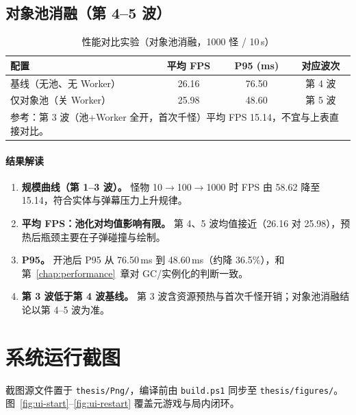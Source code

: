 \subsection{对象池消融（第 4--5 波）}

\begin{table}[htbp]
  \centering
  \caption{性能对比实验（对象池消融，1000 怪 / 10\,s）}
  \label{tab:perf}
  \begin{tabular}{lccc}
    \toprule
    \textbf{配置} & \textbf{平均 FPS} & \textbf{P95 (ms)} & \textbf{对应波次} \\
    \midrule
    基线（无池、无 Worker） & 26.16 & 76.50 & 第 4 波 \\
    仅对象池（关 Worker） & 25.98 & 48.60 & 第 5 波 \\
    \midrule
    \multicolumn{4}{l}{\footnotesize 参考：第 3 波（池+Worker 全开，首次千怪）平均 FPS 15.14，不宜与上表直接对比。} \\
    \bottomrule
  \end{tabular}
\end{table}

\paragraph{结果解读}
\begin{enumerate}
  \item \textbf{规模曲线（第 1--3 波）。} 怪物 10$\rightarrow$100$\rightarrow$1000 时 FPS 由 58.62 降至 15.14，符合实体与弹幕压力上升规律。
  \item \textbf{平均 FPS：池化对均值影响有限。} 第 4、5 波均值接近（26.16 对 25.98），预热后瓶颈主要在子弹碰撞与绘制。
  \item \textbf{P95。} 开池后 P95 从 76.50\,ms 到 48.60\,ms（约降 36.5\%），和第~\ref{chap:performance}~章对 GC/实例化的判断一致。
  \item \textbf{第 3 波低于第 4 波基线。} 第 3 波含资源预热与首次千怪开销；对象池消融结论以第 4--5 波为准。
\end{enumerate}

\section{系统运行截图}

截图源文件置于 \texttt{thesis/Png/}，编译前由 \texttt{build.ps1} 同步至 \texttt{thesis/figures/}。图~\ref{fig:ui-start}--\ref{fig:ui-restart} 覆盖元游戏与局内闭环。


